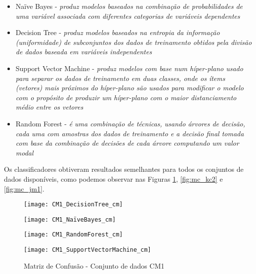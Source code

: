 \documentclass[10pt]{article}
\begin{document}
    \begin{itemize}
        \item Naïve Bayes - \textit{produz modelos baseados na combinação de probabilidades de uma variável associada com diferentes categorias de variáveis dependentes}
        \item Decision Tree - \textit{produz modelos baseados na entropia da informação (uniformidade) de subconjuntos dos dados de treinamento obtidos pela divisão de dados baseada em variáveis independentes}
        \item Support Vector Machine - \textit{produz modelos com base num híper-plano usado para separar os dados de treinamento em duas classes, onde os ítems (vetores) mais próximos do híper-plano são usados para modificar o modelo com o propósito de produzir um híper-plano com o maior distanciamento médio entre os vetores}
        \item Random Forest - \textit{é uma combinação de técnicas, usando árvores de decisão, cada uma com amostras dos dados de treinamento e a decisão final tomada com base da combinação de decisões de cada árvore computando um valor modal}
    \end{itemize}

    Os classificadores obtiveram resultados semelhantes para todos os conjuntos de dados disponíveis, como podemos observar nas Figuras \ref{fig:mc_cm1}, \ref{fig:mc_kc2} e \ref{fig:mc_jm1}.

    \begin{figure}
        \centering
        \begin{minipage}{0.25\textwidth}
            \centering
            \texttt{[image: CM1\_DecisionTree\_cm]}
        \end{minipage}\hfill
        \begin{minipage}{0.25\textwidth}
            \centering
            \texttt{[image: CM1\_NaïveBayes\_cm]}
        \end{minipage}\hfill
        \begin{minipage}{0.25\textwidth}
            \centering
            \texttt{[image: CM1\_RandomForest\_cm]}
        \end{minipage}\hfill
        \begin{minipage}{0.25\textwidth}
            \centering
            \texttt{[image: CM1\_SupportVectorMachine\_cm]}
        \end{minipage}\hfill
        \caption{Matriz de Confusão - Conjunto de dados CM1}\label{fig:mc_cm1}
    \end{figure}
\end{document}
